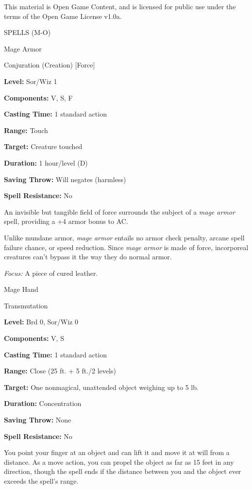 \documentclass{article}
\begin{document}
This material is Open Game Content, and is licensed for public use under the terms 
of the Open Game License v1.0a.

{\LARGE{}SPELLS (M-O)}

\vspace{12pt}
Mage Armor

Conjuration (Creation) [Force]

\textbf{Level:} Sor/Wiz 1

\textbf{Components:} V, S, F

\textbf{Casting Time:} 1 standard action

\textbf{Range:} Touch

\textbf{Target:} Creature touched

\textbf{Duration:} 1 hour/level (D)

\textbf{Saving Throw: }Will negates (harmless)

\textbf{Spell Resistance:} No

An invisible but tangible field of force surrounds the subject of a \textit{mage 
armor }spell, providing a +4 armor bonus to AC.

Unlike mundane armor, \textit{mage armor }entails no armor check penalty, arcane 
spell failure chance, or speed reduction. Since \textit{mage armor }is made of 
force, incorporeal creatures can't bypass it the way they do normal armor.

\textit{Focus: }A piece of cured leather.

\vspace{12pt}
Mage Hand

Transmutation

\textbf{Level:} Brd 0, Sor/Wiz 0

\textbf{Components:} V, S

\textbf{Casting Time:} 1 standard action

\textbf{Range:} Close (25 ft. + 5 ft./2 levels)

\textbf{Target:} One nonmagical, unattended object weighing up to 5 lb.

\textbf{Duration:} Concentration

\textbf{Saving Throw:} None

\textbf{Spell Resistance:} No

You point your finger at an object and can lift it and move it at will from a distance. 
As a move action, you can propel the object as far as 15 feet in any direction, 
though the spell ends if the distance between you and the object ever exceeds the 
spell's range.
\end{document}
